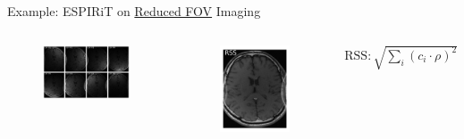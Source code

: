 \documentclass[aspectratio=169]{beamer}
\begin{document}
	\begin{frame}{Example: ESPIRiT on \underline{Reduced FOV} Imaging}
		\begin{columns}
			\begin{figure}
				\centering
				\includegraphics[width=\columnwidth]{figures/espirit_coil_images.png}
			\end{figure}
			
			\begin{figure}
				\centering
				\includegraphics[width=\columnwidth]{figures/espirit_rss.png}
			\end{figure}
			
			\centering
			$\text{RSS} : \sqrt{\sum_i (c_i \cdot \rho)^2}$
		\end{columns}
	\end{frame}
\end{document}
